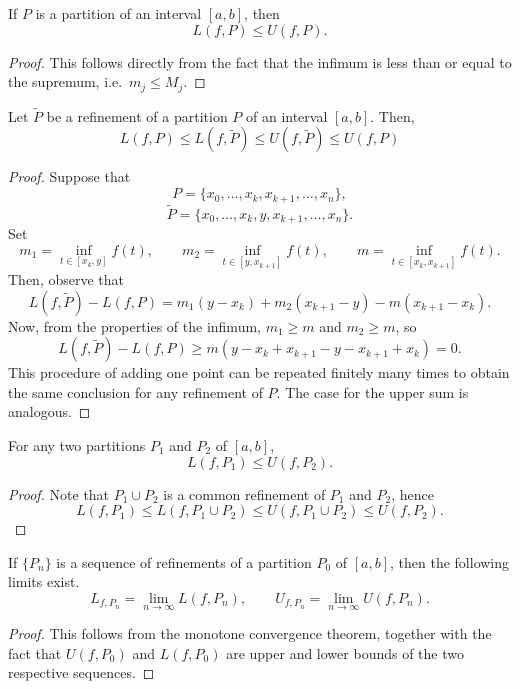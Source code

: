 \documentclass[11pt]{article}
\theoremstyle{definition}
\theoremstyle{remark}
\numberwithin{equation}{module}
\begin{document}
    \begin{lemma}
        If $P$ is a partition of an interval $[a, b]$, then \[
            L(f, P) \leq U(f, P).
        \] 
    \end{lemma}
    \begin{proof}
        This follows directly from the fact that the infimum is less than or equal
        to the supremum, i.e.\ $m_j \leq M_j$.
    \end{proof}
    \begin{theorem}
        Let $\tilde{P}$ be a refinement of a partition $P$ of an interval $[a, b]$.
        Then, \[
            L(f, P) \leq L(f, \tilde{P}) \leq U(f, \tilde{P}) \leq U(f, P)
        \] 
    \end{theorem}
    \begin{proof}
        Suppose that \[
            P = \{x_0, \dots, x_k, x_{k + 1}, \dots, x_n\},
        \] \[
            \tilde{P} = \{x_0, \dots, x_k, y, x_{k + 1}, \dots, x_n\}.
        \] Set \[
            m_1 = \inf_{t \in [x_{k}, y]}f(t), \qquad 
            m_2 = \inf_{t \in [y, x_{k + 1}]}f(t), \qquad
            m = \inf_{t \in [x_k, x_{k + 1}]}f(t).
        \] Then, observe that \[
            L(f, \tilde{P}) - L(f, P) = m_1(y - x_k) + 
            m_2(x_{k + 1} - y) - 
            m(x_{k + 1} - x_k).
        \] Now, from the properties of the infimum, $m_1 \geq m$ and $m_2 \geq m$,
        so \[
            L(f, \tilde{P}) - L(f, P) \geq m(y - x_k + x_{k + 1} - y - x_{k + 1} +
            x_k) = 0.
        \] This procedure of adding one point can be repeated finitely many times to
        obtain the same conclusion for any refinement of $P$. The case for the upper
        sum is analogous.
    \end{proof}

    \begin{corollary}
        For any two partitions $P_1$ and $P_2$ of $[a, b]$, \[
            L(f, P_1) \leq U(f, P_2).
        \] 
    \end{corollary}
    \begin{proof}
        Note that $P_1\cup P_2$ is a common refinement of $P_1$ and $P_2$,
        hence \[
            L(f, P_1) \leq L(f, P_1 \cup P_2) \leq U(f, P_1\cup P_2) \leq U(f, P_2).
        \] 
    \end{proof}
    \begin{corollary}
        If $\{P_n\}$ is a sequence of refinements of a partition $P_0$ of $[a, b]$,
        then the following limits exist. \[
            L_{f, P_n} = \lim_{n \to \infty} L(f, P_n), \qquad 
            U_{f, P_n} = \lim_{n \to \infty} U(f, P_n). 
        \]
    \end{corollary}
    \begin{proof}
        This follows from the monotone convergence theorem, together with the fact
        that $U(f, P_0)$ and $L(f, P_0)$ are upper and lower bounds of the two
        respective sequences.
    \end{proof}
\end{document}
